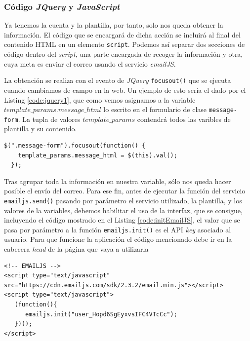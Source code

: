 \subsubsection*{Código \textit{JQuery} y \textit{JavaScript}}
Ya tenemos la cuenta y la plantilla, por tanto, solo nos queda obtener la información. El código que se encargará de dicha acción se incluirá al final del contenido HTML en un elemento \texttt{script}. Podemos así separar dos secciones de código dentro del \textit{script}, una parte encargada de recoger la información y otra, cuya meta es enviar el correo usando el servicio \textit{emailJS}.

La obtención se realiza con el evento de \textit{JQuery} \texttt{focusout()} que se ejecuta cuando cambiamos de campo en la web. Un ejemplo de esto sería el dado por el Listing \ref{code:jquery1}, que como vemos asignamos a la variable \texttt{$template\_params.message\_html$} lo escrito en el formulario de clase \texttt{message-form}. La tupla de valores \texttt{$template\_params$} contendrá todos las varibles de plantilla y su contenido. 

\begin{lstlisting}[caption=Código para obtener la información de \texttt{message-form},label={code:jquery1}]
  $(".message-form").focusout(function() {
    template_params.message_html = $(this).val();
  });
\end{lstlisting}

Tras agrupar toda la información en nuestra variable, sólo nos queda hacer posible el envío del correo. Para ese fin, antes de ejecutar la función del servicio \texttt{emailjs.send()} pasando por parámetro el servicio utilizado, la plantilla, y los valores de la variables, debemos habilitar el uso de la interfaz, que se consigue, incluyendo el código mostrado en el Listing \ref{code:initEmailJS}, el valor que se pasa por parámetro a la función \texttt{emailjs.init()} es el API \textit{key} asociado al usuario. Para que funcione la aplicación el código mencionado debe ir en la cabecera \textit{head} de la página que vaya a utilizarla

\begin{lstlisting}[caption=Código que permite conectarse con la interfaz de \textit{emailJs},label={code:initEmailJS}]
  <!-- EMAILJS -->
<script type="text/javascript" src="https://cdn.emailjs.com/sdk/2.3.2/email.min.js"></script>
<script type="text/javascript">
   (function(){
      emailjs.init("user_Hopd6SgEyxvsIFC4VTcCc");
   })();
</script>
\end{lstlisting}


